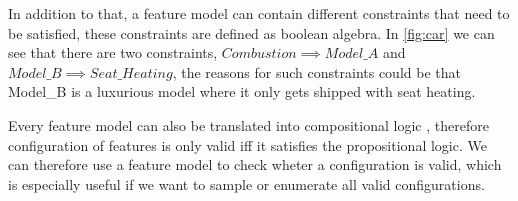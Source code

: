 In addition to that, a feature model can contain different constraints that need to be satisfied, these constraints are defined as boolean 
algebra. In \ref{fig:car} we can see that there are two constraints, $Combustion \implies Model\_A$ and 
$Model\_B \implies Seat\_Heating$, the reasons for such constraints could be that Model\_B is a luxurious model where it only gets shipped
with seat heating.

Every feature model can also be translated into compositional logic \cite*{Feature-Oriented-Software-Product-Lines-Feature-models}, therefore
configuration of features is only valid iff it satisfies the propositional logic. We can therefore use a feature model to check wheter a 
configuration is valid, which is especially useful if we want to sample or enumerate all valid configurations. 